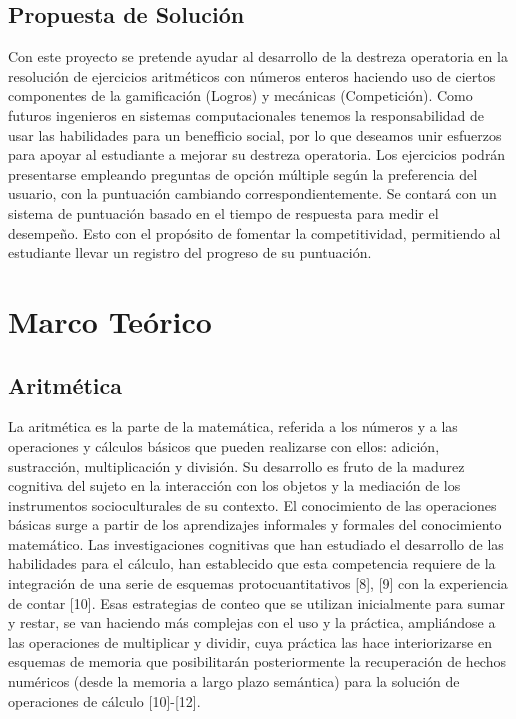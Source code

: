 \documentclass{article}
\begin{document}
\subsection{Propuesta de Solución}
Con este proyecto se pretende ayudar al desarrollo de la destreza operatoria en la resolución de ejercicios aritméticos con números enteros haciendo uso de ciertos componentes de la gamificación (Logros) y mecánicas (Competición). Como futuros ingenieros en sistemas computacionales tenemos la responsabilidad de usar las habilidades para un benefficio social, por lo que deseamos unir esfuerzos para apoyar al estudiante a mejorar su destreza operatoria.
Los ejercicios podrán presentarse empleando preguntas de opción múltiple según la preferencia del usuario,
con la puntuación cambiando correspondientemente. Se contará con un sistema de puntuación basado en el tiempo de
respuesta para medir el desempeño. Esto con el propósito de fomentar la competitividad, permitiendo al estudiante llevar
un registro del progreso de su puntuación.
\section{Marco Teórico}
\subsection{Aritmética}
La aritmética es la parte de la matemática, referida a los números y a las operaciones y cálculos básicos que pueden realizarse con ellos: adición, sustracción, multiplicación y división. Su desarrollo es fruto de la madurez cognitiva del sujeto en la interacción con los objetos y la mediación de los instrumentos socioculturales de su contexto. El conocimiento de las operaciones básicas surge a partir de los aprendizajes informales y formales del conocimiento matemático.
Las investigaciones cognitivas que han estudiado el desarrollo de las habilidades para el cálculo, han establecido que esta competencia requiere de la integración de una serie de esquemas protocuantitativos [8], [9] con la experiencia de contar [10].
Esas estrategias de conteo que se utilizan inicialmente para sumar y restar, se van haciendo más complejas con el uso y la práctica, ampliándose a las operaciones de multiplicar y dividir, cuya práctica las hace interiorizarse en esquemas de memoria que posibilitarán posteriormente la recuperación de hechos numéricos (desde la memoria a largo plazo semántica) para la solución de operaciones de cálculo [10]-[12].
\end{document}
